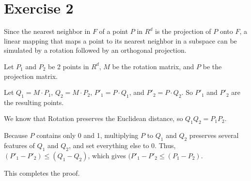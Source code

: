 \section*{Exercise 2}
Since the nearest neighbor in $F$ of a point $P$ in $R^d$ is the projection of $P$ onto $F$, a linear mapping that maps a point to its nearest neighbor in a subspace can
be simulated by a rotation followed by an orthogonal projection.

Let $P_1$ and $P_2$ be 2 points in $R^d$, $M$ be the rotation matrix, and $P$ be the projection matrix. 

Let $Q_1 = M \cdot P_1$, $Q_2 = M \cdot P_2$, $P'_1 = P \cdot Q_1$, and $P'_2 = P \cdot Q_2$. So $P'_1$ and $P'_2$ are the resulting points.

We know that Rotation preserves the Euclidean distance, so $Q_1 Q_2 = P_1 P_2$.

Because $P$ contains only 0 and 1, multiplying $P$ to $Q_1$ and $Q_2$ preserves several features of $Q_1$ and $Q_2$, and set everything else to 0. Thus, $(P'_1 - P'_2) \leq (Q_1 - Q_2)$, which gives $(P'_1 - P'_2 \leq (P_1 - P_2)$.

This completes the proof.
